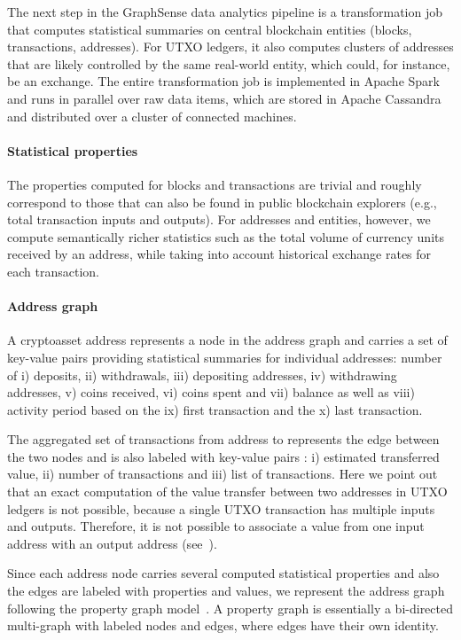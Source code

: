The next step in the GraphSense data analytics pipeline is a transformation job that computes statistical summaries on central blockchain entities (blocks, transactions, addresses). For UTXO ledgers, it also computes clusters of addresses that are likely controlled by the same real-world entity, which could, for instance, be an exchange. The entire transformation job is implemented in Apache Spark and runs in parallel over raw data items, which are stored in Apache Cassandra and distributed over a cluster of connected machines.

\paragraph{Statistical properties} The properties computed for blocks and transactions are trivial and roughly correspond to those that can also be found in public blockchain explorers (e.g., total transaction inputs and outputs). For addresses and entities, however, we compute semantically richer statistics such as the total volume of currency units received by an address, while taking into account historical exchange rates for each transaction.

\paragraph{Address graph} A cryptoasset address  represents a node in the address graph and carries a set of key-value pairs  providing statistical summaries for individual addresses: number of i) deposits, ii) withdrawals, iii) depositing addresses, iv) withdrawing addresses, v) coins received, vi) coins spent and vii) balance as well as viii) activity period based on the ix) first transaction and the x) last transaction.

The aggregated set of transactions  from address  to  represents the edge between the two nodes and is also labeled with key-value pairs : i) estimated transferred value, ii) number of transactions and iii) list of transactions. Here we point out that an exact computation of the value transfer between two addresses in UTXO ledgers is not possible, because a single UTXO transaction has multiple inputs and outputs. Therefore, it is not possible to associate a value from one input address with an output address (see~\cite{Haslhofer:2016ab}).

Since each address node carries several computed statistical properties and also the edges are labeled with properties and values, we represent the address graph following the property graph model~\cite{Rodriguez:2010}. A property graph is essentially a bi-directed multi-graph with labeled nodes and edges, where edges have their own identity.


